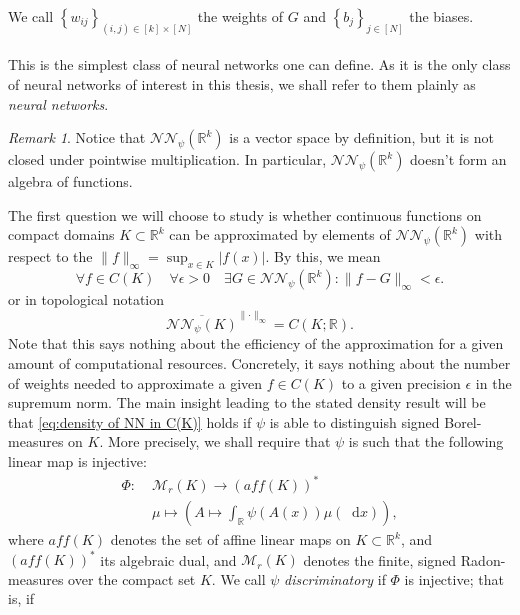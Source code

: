 \documentclass[11pt,a4paper,twoside,openany]{report}
\newcommand{\diff}{\mathop{}\!\mathrm{d}}
\theoremstyle{plain} %
\theoremstyle{definition} %
\theoremstyle{remark} %
\newtheorem{remark}[remark]{Remark}
\begin{document}
We call \(\left\{w_{ij}\right\}_{(i,j)\in[k]\times [N]}\) the weights of \(G\) and \(\left\{b_{j}\right\}_{j\in [N]}\) the biases. 
\\\\
This is the simplest class of neural networks one can define. As it is the only class of neural networks of interest in this thesis, we shall refer to them plainly as \textit{neural networks}. 
\begin{remark}\label{rem:NN don't form algebra}
    Notice that \(\mathcal{NN}_{\psi}(\mathbb{R}^k)\) is a vector space by definition, but it is not closed under pointwise multiplication. In particular, \(\mathcal{NN}_{\psi}(\mathbb{R}^k)\) doesn't form an algebra of functions.
\end{remark}
The first question we will choose to study is whether continuous functions on compact domains \(K\subset\mathbb{R}^k\) can be approximated by elements of \(\mathcal{NN}_{\psi}(\mathbb{R}^k)\) with respect to the \(\lVert f\rVert_{\infty}=\sup_{x\in K}|f(x)|\). By this, we mean 
\begin{equation}
    \forall{f}\in C(K)\quad\forall\epsilon>0\quad\exists G\in\mathcal{NN}_{\psi}(\mathbb{R}^k):\lVert f-G\rVert_{\infty}<\epsilon.
\end{equation}
or in topological notation
\begin{equation}\label{eq:density of NN in C(K)}
    \overline{\mathcal{NN}_{\psi}(K)}^{\lVert\cdot\rVert_\infty}=C(K;\mathbb{R}).
\end{equation}
Note that this says nothing about the efficiency of the approximation for a given amount of computational resources. Concretely, it says nothing about the number of weights needed to approximate a given \(f\in C(K)\) to a given precision \(\epsilon\) in the supremum norm. 
\bigbreak
The main insight leading to the stated density result will be that \cref{eq:density of NN in C(K)} holds if \(\psi\) is able to distinguish signed Borel-measures on \(K\). More precisely, we shall require that \(\psi\) is such that the following linear map is injective:
\begin{align*}
    \Phi:\;&\mathcal{M}_r(K)\to \left(\textit{aff}(K)\right)^*\\
    &\mu\mapsto\left( A\mapsto\int_{\mathbb{R}}\psi(A(x))\mu(\diff x)\right),
\end{align*}
where \(\textit{aff}(K)\) denotes the set of affine linear maps on \(K\subset\mathbb{R}^k\), and \(\left(\textit{aff}(K)\right)^*\) its algebraic dual, and \(\mathcal{M}_r(K)\) denotes the finite, signed Radon-measures over the compact set \(K\). We call \(\psi\) \textit{discriminatory} if \(\Phi\) is injective; that is, if 
\end{document}
